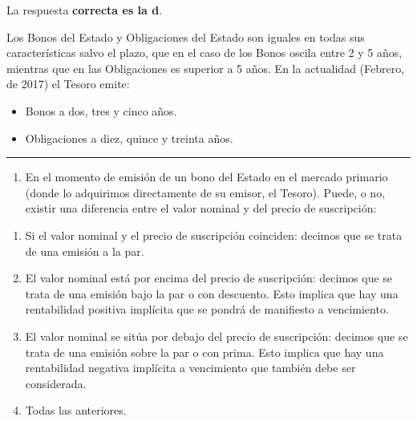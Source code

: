 \documentclass[
  letterpaper,
  DIV=11,
  numbers=noendperiod]{scrreprt}
\providecommand{\tightlist}{%
  \setlength{\itemsep}{0pt}\setlength{\parskip}{0pt}}\usepackage{longtable,booktabs,array}
\begin{document}
\begin{tcolorbox}[enhanced jigsaw, left=2mm, opacityback=0, colback=white, breakable, arc=.35mm, bottomrule=.15mm, rightrule=.15mm, toprule=.15mm, leftrule=.75mm, colframe=quarto-callout-tip-color-frame]
\begin{minipage}[t]{5.5mm}
\textcolor{quarto-callout-tip-color}{\faLightbulb}
\end{minipage}%
\begin{minipage}[t]{\textwidth - 5.5mm}

La respuesta \textbf{correcta es la d}.

Los Bonos del Estado y Obligaciones del Estado son iguales en todas sus
características salvo el plazo, que en el caso de los Bonos oscila entre
2 y 5 años, mientras que en las Obligaciones es superior a 5 años. En la
actualidad (Febrero, de 2017) el Tesoro emite:

\begin{itemize}
\item
  Bonos a dos, tres y cinco años.
\item
  Obligaciones a diez, quince y treinta años.
\end{itemize}

\end{minipage}%
\end{tcolorbox}

\begin{center}\rule{0.5\linewidth}{0.5pt}\end{center}

\begin{enumerate}
\def\labelenumi{\arabic{enumi}.}
\setcounter{enumi}{22}
\tightlist
\item
  En el momento de emisión de un bono del Estado en el mercado primario
  (donde lo adquirimos directamente de su emisor, el Tesoro). Puede, o
  no, existir una diferencia entre el valor nominal y del precio de
  suscripción:
\end{enumerate}

\begin{enumerate}
\def\labelenumi{\alph{enumi}.}
\item
  Si el valor nominal y el precio de suscripción coinciden: decimos que
  se trata de una emisión a la par.
\item
  El valor nominal está por encima del precio de suscripción: decimos
  que se trata de una emisión bajo la par o con descuento. Esto implica
  que hay una rentabilidad positiva implícita que se pondrá de
  manifiesto a vencimiento.
\item
  El valor nominal se sitúa por debajo del precio de suscripción:
  decimos que se trata de una emisión sobre la par o con prima. Esto
  implica que hay una rentabilidad negativa implícita a vencimiento que
  también debe ser considerada.
\item
  Todas las anteriores.
\end{enumerate}
\end{document}
